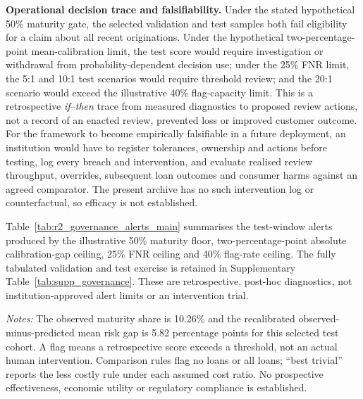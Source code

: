 \documentclass[10pt]{article}
\begin{document}
\noindent\textbf{Operational decision trace and falsifiability.} Under the stated hypothetical 50\% maturity gate, the selected validation and test samples both fail eligibility for a claim about all recent originations. Under the hypothetical two-percentage-point mean-calibration limit, the test score would require investigation or withdrawal from probability-dependent decision use; under the 25\% FNR limit, the 5:1 and 10:1 test scenarios would require threshold review; and the 20:1 scenario would exceed the illustrative 40\% flag-capacity limit. This is a retrospective \emph{if--then} trace from measured diagnostics to proposed review actions, not a record of an enacted review, prevented loss or improved customer outcome. For the framework to become empirically falsifiable in a future deployment, an institution would have to register tolerances, ownership and actions before testing, log every breach and intervention, and evaluate realised review throughput, overrides, subsequent loan outcomes and consumer harms against an agreed comparator. The present archive has no such intervention log or counterfactual, so efficacy is not established.

Table~\ref{tab:r2_governance_alerts_main} summarises the test-window alerts produced by the illustrative 50\% maturity floor, two-percentage-point absolute calibration-gap ceiling, 25\% FNR ceiling and 40\% flag-rate ceiling. The fully tabulated validation and test exercise is retained in Supplementary Table~\ref{tab:supp_governance}. These are retrospective, post-hoc diagnostics, not institution-approved alert limits or an intervention trial.

\begin{table}[!ht]
\centering
\caption{Illustrative retrospective governance alerts for the selected test cohort. All limits are post-hoc examples; costs are unobserved classification-loss proxies, not human-review expenditure.}
\label{tab:r2_governance_alerts_main}
\vspace{2pt}
{\footnotesize \textit{Notes:} The observed maturity share is 10.26\% and the recalibrated observed-minus-predicted mean risk gap is 5.82 percentage points for this selected test cohort. A flag means a retrospective score exceeds a threshold, not an actual human intervention. Comparison rules flag no loans or all loans; ``best trivial'' reports the less costly rule under each assumed cost ratio. No prospective effectiveness, economic utility or regulatory compliance is established.}
\end{table}
\end{document}
